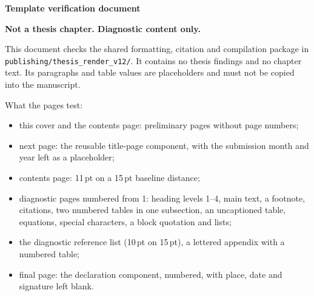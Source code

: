 \thispagestyle{thesisreview}
\begin{center}
{\fontsize{14bp}{19.5bp}\selectfont\bfseries Template verification document\par}
\vspace{9.75pt}
{\bfseries Not a thesis chapter. Diagnostic content only.}\par
\end{center}
\vspace{19.5pt}
\noindent This document checks the shared formatting, citation and compilation package in
\texttt{publishing/thesis\_render\_v12/}. It contains no thesis findings and no chapter text.
Its paragraphs and table values are placeholders and must not be copied into the manuscript.

\medskip
\noindent What the pages test:
\begin{itemize}\tightlist
\item this cover and the contents page: preliminary pages without page numbers;
\item next page: the reusable title-page component, with the submission month and year left as a placeholder;
\item contents page: 11\,pt on a 15\,pt baseline distance;
\item diagnostic pages numbered from 1: heading levels 1--4, main text, a footnote, citations, two numbered tables in one subsection, an uncaptioned table, equations, special characters, a block quotation and lists;
\item the diagnostic reference list (10\,pt on 15\,pt), a lettered appendix with a numbered table;
\item final page: the declaration component, numbered, with place, date and signature left blank.
\end{itemize}
